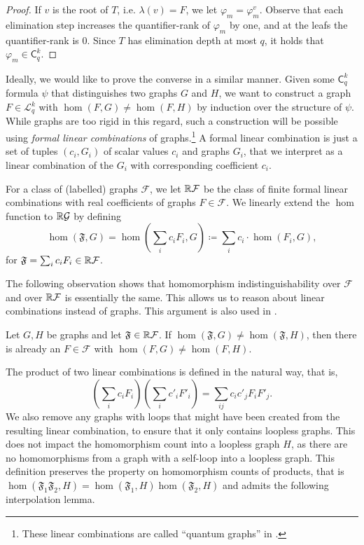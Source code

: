 \documentclass{lmcs}
\theoremstyle{plain}\newtheorem{claim}[thm]{Claim}   %
\newcommand{\RR}{\ensuremath \mathbb{R}}
\newcommand{\cG}{\ensuremath{\mathcal G}}
\newcommand{\cL}{\ensuremath{\mathcal L}}
\newcommand{\Lkq}{\ensuremath{\cL_{q}^{k}}}
\newcommand{\lC} {\ensuremath{\mathsf C}}
\newcommand{\qg}[1]{\ensuremath{\mathfrak{#1}}}
\newcommand{\elimDepth}{elimination depth}
\renewcommand\phi\varphi
\begin{document}
\begin{proof}
	If $v$ is the root of $T$, i.e. $\lambda(v) = F$, we let $\phi_m = \phi_m^v$.
	Observe that each elimination step increases the quantifier-rank of $\phi_m$ by one, and at the leafs the quantifier-rank is 0.
	Since $T$ has \elimDepth{} at most $q$, it holds that $\phi_m \in \lC^k_q$.
\end{proof}

Ideally, we would like to prove the converse in a similar manner.
Given some $\lC^k_q$ formula $\psi$ that distinguishes two graphs $G$ and $H$, we want to construct a graph $F \in \Lkq$ with $\hom(F, G) \neq \hom(F, H)$ by induction over the structure of $\psi$.
While graphs are too rigid in this regard, such a construction will be possible using \emph{formal linear combinations} of graphs.\footnote{These linear combinations are called \enquote{quantum graphs} in \cite{Dvorak_recognizing_2010}.} A formal linear combination is just a set of tuples $(c_i, G_i)$ of scalar values $c_i$ and graphs $G_i$, that we interpret as a linear combination of the $G_i$ with corresponding coefficient $c_i$.

For a class of (labelled) graphs $\mathcal{F}$, we let $\RR\mathcal{F}$ be the class of finite formal linear combinations with real coefficients of graphs $F \in \mathcal{F}$.
We linearly extend the $\hom$ function to $\RR\cG$ by defining
\begin{equation*}
	\hom(\qg{F}, G) = \hom(\sum_i c_iF_i, G) \coloneqq \sum_i c_i \cdot \hom(F_i, G),
\end{equation*}
for $\qg{F} = \sum_i c_iF_i \in \RR\mathcal{F}$.

The following observation shows that homomorphism indistinguishability over $\mathcal{F}$ and over $\RR\mathcal{F}$ is essentially the same. This allows us to reason about linear combinations instead of graphs.
This argument is also used in \cite{Dvorak_recognizing_2010}.

\begin{obs}\label{prp:qgdistinguishing}
	Let $G, H$ be graphs and let $\qg{F} \in \RR\mathcal{F}$.
	If $\hom(\qg{F}, G) \neq \hom(\qg{F}, H)$, then there is already an $F \in \mathcal{F}$ with $\hom(F, G) \neq \hom(F, H)$.
\end{obs}

The product of two linear combinations is defined in the natural way, that is,
\begin{equation*}
	\left(\sum_i c_i F_i\right)\left(\sum_i c'_i F'_i\right) = \sum_{ij} c_ic'_j F_iF'_j.
\end{equation*}
We also remove any graphs with loops that might have been created from the resulting linear combination, to ensure that it only contains loopless graphs.
This does not impact the homomorphism count into a loopless graph $H$, as there are no homomorphisms from a graph with a self-loop into a loopless graph.
This definition preserves the property on homomorphism counts of products, that is $\hom(\qg{F}_1\qg{F}_2, H) = \hom(\qg{F}_1, H)\hom(\qg{F}_2, H)$ and admits the following interpolation lemma.
\end{document}
